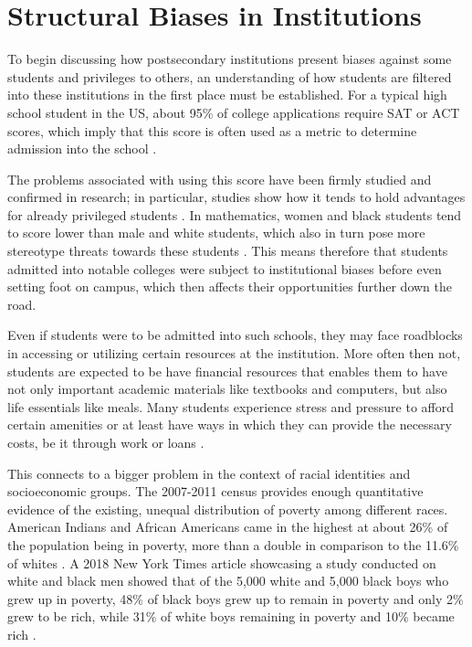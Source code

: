 \section{Structural Biases in Institutions}
To begin discussing how postsecondary institutions present biases against some students and privileges to others, an understanding of how students are filtered into these institutions in the first place must be established. For a typical high school student in the US, about 95\% of college applications require SAT or ACT scores, which imply that this score is often used as a metric to determine admission into the school \citep{morse_about_2008}.

The problems associated with using this score have been firmly studied and confirmed in research; in particular, studies show how it tends to hold advantages for already privileged students \citep{buchmann_shadow_2010}. In mathematics, women and black students tend to score lower than male and white students, which also in turn pose more stereotype threats towards these students \citep{lovaglia_stereotype_2004}. This means therefore that students admitted into notable colleges were subject to institutional biases before even setting foot on campus, which then affects their opportunities further down the road.

Even if students were to be admitted into such schools, they may face roadblocks in accessing or utilizing certain resources at the institution. More often then not, students are expected to be have financial resources that enables them to have not only important academic materials like textbooks and computers, but also life essentials like meals. Many students experience stress and pressure to afford certain amenities or at least have ways in which they can provide the necessary costs, be it through work or loans \citep{ross_sources_1999}.

This connects to a bigger problem in the context of racial identities and socioeconomic groups. The 2007-2011 census provides enough quantitative evidence of the existing, unequal distribution of poverty among different races. American Indians and African Americans came in the highest at about 26\% of the population being in poverty, more than a double in comparison to the 11.6\% of whites \citep{bureau_poverty_2013}. A 2018 New York Times article showcasing a study conducted on white and black men showed that of the 5,000 white and 5,000 black boys who grew up in poverty, 48\% of black boys grew up to remain in poverty and only 2\% grew to be rich, while 31\% of white boys remaining in poverty and 10\% became rich \citep{badger_extensive_2018}.


